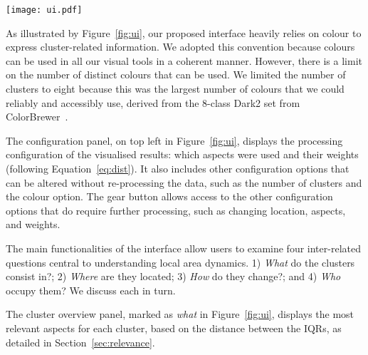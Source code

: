 \begin{figure*}
    \centering 
    \texttt{[image: ui.pdf]}
    \caption{Initial interface of our method showing the demographic evolution of Chicago and identifying the objectives of each plot.
        \textbf{(what)}: Cluster overview illustrating the most relevant aspect for each cluster. 
        \textbf{(where)}: Maps illustrating the geographical location, both as an overall summary and for each year.
        \textbf{(how)}: Tabular and visual summary of how the regions classification changed over time.
        \textbf{(who)}: Demographic details for the currently selected data.
        \label{fig:ui}}
\end{figure*}


As illustrated by Figure~\ref{fig:ui}, our proposed interface heavily
relies on colour to express cluster-related information. We adopted
this convention because colours can be used in all our visual tools in
a coherent manner. However, there is a limit on the number of distinct
colours that can be used. We limited the number of clusters to eight
because this was the largest number of colours that we could reliably
and accessibly use, derived from the 8-class Dark2 set from
ColorBrewer~\citep{ColorBrewer}.


The configuration panel, on top left in Figure~\ref{fig:ui}, displays the
processing configuration of the visualised results: which aspects were used and
their weights (following Equation~\ref{eq:dist}). It also includes other
configuration options that can be altered without re-processing the data, such
as the number of clusters and the colour option. The gear button allows access
to the other configuration options that do require further processing, such as
changing location, aspects, and weights. 

The main functionalities of the interface allow users to examine four
inter-related questions central to understanding local area dynamics. 1)
\emph{What} do the clusters consist in?; 2) \emph{Where} are they located; 3)
\emph{How} do they change?; and 4) \emph{Who} occupy them? We discuss each in
turn.  

The cluster overview panel, marked as \emph{what} in Figure~\ref{fig:ui},
displays the most relevant aspects for each cluster, based on the distance
between the IQRs, as detailed in Section~\ref{sec:relevance}.


